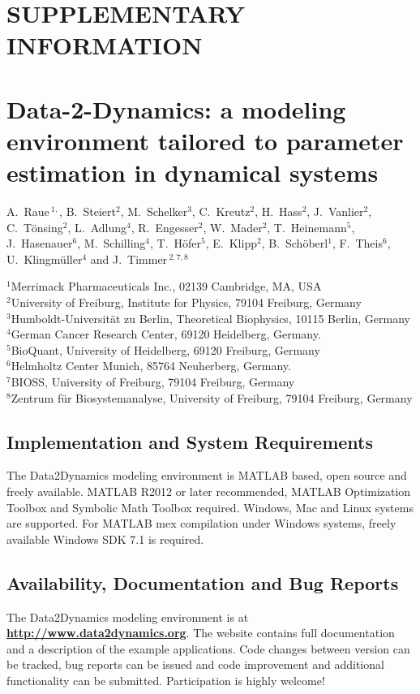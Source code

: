 \documentclass[12pt,a4paper]{scrartcl}
\begin{document}
\section*{SUPPLEMENTARY INFORMATION}
\section*{Data-2-Dynamics: a modeling environment 
tailored to parameter estimation in dynamical systems}

\noindent A.~Raue\,$^{1,}$, B.~Steiert$^{2}$, M.~Schelker$^{3}$, C.~Kreutz$^{2}$, H.~Hass$^{2}$, J.~Vanlier$^{2}$, C.~T\"onsing$^{2}$, L.~Adlung$^{4}$, R.~Engesser$^{2}$, W.~Mader$^{2}$, T.~Heinemann$^{5}$, J.~Hasenauer$^{6}$, M.~Schilling$^{4}$, T.~H\"ofer$^{5}$, E.~Klipp$^{2}$, B.~Sch\"oberl$^{1}$, F.~Theis$^{6}$, U.~Klingm\"uller$^{4}$ and J.~Timmer\,$^{2,7,8}$

\noindent $^{1}$Merrimack Pharmaceuticals Inc., 02139 Cambridge, MA, USA\\
$^{2}$University of Freiburg, Institute for Physics, 79104 Freiburg, Germany\\
$^{3}$Humboldt-Universit\"at zu Berlin, Theoretical Biophysics, 10115 Berlin, Germany\\
$^{4}$German Cancer Research Center, 69120 Heidelberg, Germany.\\
$^{5}$BioQuant, University of Heidelberg, 69120 Freiburg, Germany\\
$^{6}$Helmholtz Center Munich, 85764 Neuherberg, Germany.\\
$^{7}$BIOSS, University of Freiburg, 79104 Freiburg, Germany\\
$^{8}$Zentrum f\"ur Biosystemanalyse, University of Freiburg, 79104 Freiburg, 
Germany

\subsection*{Implementation and System Requirements} 
The Data2Dynamics modeling environment is MATLAB based, open source and freely available. MATLAB R2012 or later recommended, MATLAB Optimization Toolbox and Symbolic Math Toolbox required. Windows, Mac and Linux systems are supported. For MATLAB mex compilation under Windows systems, freely available Windows SDK 7.1 is required.

\subsection*{Availability, Documentation and Bug Reports}
The Data2Dynamics modeling environment is at \href{http://www.data2dynamics.org}{{\bf http://www.data2dynamics.org}}. The website contains full documentation and a description of the example applications. Code changes between version can be tracked, bug reports can be issued and code improvement and additional functionality can be submitted. Participation is highly welcome! 
\end{document}
